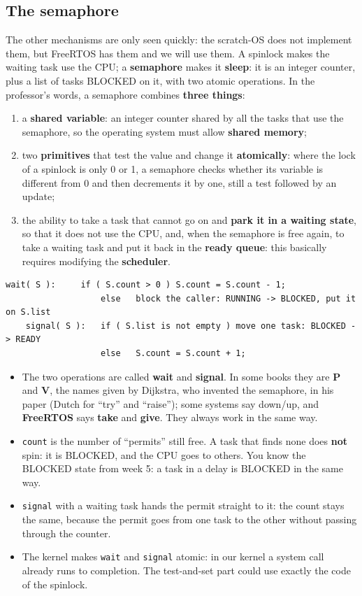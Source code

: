 \subsection{The semaphore}
The other mechanisms are only seen quickly: the scratch-OS does not implement them, but FreeRTOS has them and we will use them. A spinlock makes the waiting task use the CPU; a \textbf{semaphore} makes it \textbf{sleep}: it is an integer counter, plus a list of tasks BLOCKED on it, with two atomic operations. In the professor's words, a semaphore combines \textbf{three things}:
\begin{enumerate}
    \item a \textbf{shared variable}: an integer counter shared by all the tasks that use the semaphore, so the operating system must allow \textbf{shared memory};
    \item two \textbf{primitives} that test the value and change it \textbf{atomically}: where the lock of a spinlock is only 0 or 1, a semaphore checks whether its variable is different from 0 and then decrements it by one, still a test followed by an update;
    \item the ability to take a task that cannot go on and \textbf{park it in a waiting state}, so that it does not use the CPU, and, when the semaphore is free again, to take a waiting task and put it back in the \textbf{ready queue}: this basically requires modifying the \textbf{scheduler}.
\end{enumerate}
\begin{lstlisting}[basicstyle=\ttfamily\footnotesize]
    wait( S ):     if ( S.count > 0 ) S.count = S.count - 1;
                   else   block the caller: RUNNING -> BLOCKED, put it on S.list
    signal( S ):   if ( S.list is not empty ) move one task: BLOCKED -> READY
                   else   S.count = S.count + 1;
\end{lstlisting}
\begin{itemize}
    \item The two operations are called \textbf{wait} and \textbf{signal}. In some books they are \textbf{P} and \textbf{V}, the names given by Dijkstra, who invented the semaphore, in his paper (Dutch for ``try'' and ``raise''); some systems say down/up, and \textbf{FreeRTOS} says \textbf{take} and \textbf{give}. They always work in the same way.
    \item \texttt{count} is the number of ``permits'' still free. A task that finds none does \textbf{not} spin: it is BLOCKED, and the CPU goes to others. You know the BLOCKED state from week 5: a task in a delay is BLOCKED in the same way.
    \item \texttt{signal} with a waiting task hands the permit straight to it: the count stays the same, because the permit goes from one task to the other without passing through the counter.
    \item The kernel makes \texttt{wait} and \texttt{signal} atomic: in our kernel a system call already runs to completion. The test-and-set part could use exactly the code of the spinlock.
\end{itemize}
